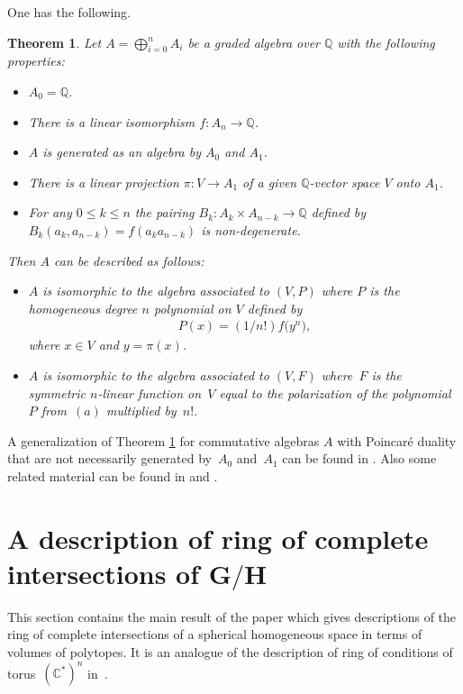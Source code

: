 \documentclass[pdftex]{sigma}
\def \C{\mathbb{C}}
\def \Q{\mathbb{Q}}
\numberwithin{equation}{section}
\newtheorem{Th}{Theorem}[section]
\theoremstyle{definition}
\begin{document}
One has the following.
\begin{Th} \label{th-ring-of-diff-op}
Let $A = \bigoplus_{i=0}^n A_i$ be a graded algebra over $\Q$ with the following properties:
\begin{itemize}\itemsep=0pt
\item[$(1)$] $A_0=\Q$.
\item[$(2)$] There is a linear isomorphism $f\colon A_n \to \Q$.
\item[$(3)$] $A$ is generated as an algebra by $A_0$ and $A_1$.
\item[$(4)$] There is a linear projection $\pi\colon V\to A_1$ of a given $\Q$-vector space $V$ onto $A_1$.
\item[$(5)$] For any $0\leq k\leq n$ the pairing $B_k\colon A_k \times A_{n-k} \to \Q$ defined by $B_k(a_k,a_{n-k})=f(a_ka_{n-k})$ is non-degenerate.
\end{itemize}
Then $A$ can be described as follows:
\begin{itemize}\itemsep=0pt
\item[$(a)$] $A$ is isomorphic to the algebra associated to $(V, P)$ where $P$ is the homogeneous degree $n$ polynomial on $V$ defined by
\begin{gather*} P(x)=(1/n!) f\big(y^n\big),\end{gather*}
where $x\in V$ and $y=\pi(x)$.
\item[$(b)$] $A$ is isomorphic to the algebra associated to $(V, F)$ where~$F$ is the symmetric $n$-linear function on~$V$ equal to the polarization of the polynomial~$P$ from~$(a)$ multiplied by~$n!$.
\end{itemize}
\end{Th}

A generalization of Theorem \ref{th-ring-of-diff-op} for commutative algebras $A$ with Poincar\'{e} duality that are not necessarily generated by~$A_0$ and~$A_1$ can be found in \cite{EstKhKaz}. Also some related material can be found in \cite[Exercise~21.7]{Eisenbud} and \cite{Kaveh-note}.

\section[A description of ring of complete intersections of $G/H$]{A description of ring of complete intersections of $\boldsymbol{G/H}$} \label{sec-descp-ring-comp-int}

This section contains the main result of the paper which gives descriptions of the ring of complete intersections of a spherical homogeneous space in terms of volumes of polytopes. It is an analogue of the description of ring of conditions of torus~$(\C^*)^n$ in~\cite{Kaz-Khov}.
\end{document}
